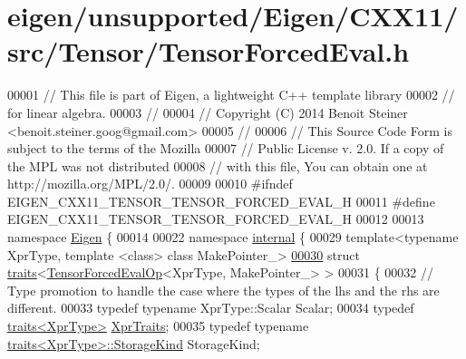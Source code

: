 \hypertarget{eigen_2unsupported_2_eigen_2_c_x_x11_2src_2_tensor_2_tensor_forced_eval_8h_source}{}\section{eigen/unsupported/\+Eigen/\+C\+X\+X11/src/\+Tensor/\+Tensor\+Forced\+Eval.h}
\label{eigen_2unsupported_2_eigen_2_c_x_x11_2src_2_tensor_2_tensor_forced_eval_8h_source}

\begin{DoxyCode}
00001 \textcolor{comment}{// This file is part of Eigen, a lightweight C++ template library}
00002 \textcolor{comment}{// for linear algebra.}
00003 \textcolor{comment}{//}
00004 \textcolor{comment}{// Copyright (C) 2014 Benoit Steiner <benoit.steiner.goog@gmail.com>}
00005 \textcolor{comment}{//}
00006 \textcolor{comment}{// This Source Code Form is subject to the terms of the Mozilla}
00007 \textcolor{comment}{// Public License v. 2.0. If a copy of the MPL was not distributed}
00008 \textcolor{comment}{// with this file, You can obtain one at http://mozilla.org/MPL/2.0/.}
00009 
00010 \textcolor{preprocessor}{#ifndef EIGEN\_CXX11\_TENSOR\_TENSOR\_FORCED\_EVAL\_H}
00011 \textcolor{preprocessor}{#define EIGEN\_CXX11\_TENSOR\_TENSOR\_FORCED\_EVAL\_H}
00012 
00013 \textcolor{keyword}{namespace }\hyperlink{namespace_eigen}{Eigen} \{
00014 
00022 \textcolor{keyword}{namespace }\hyperlink{namespaceinternal}{internal} \{
00029 \textcolor{keyword}{template}<\textcolor{keyword}{typename} XprType, \textcolor{keyword}{template} <\textcolor{keyword}{class}> \textcolor{keyword}{class }MakePointer\_>
\hyperlink{struct_eigen_1_1internal_1_1traits_3_01_tensor_forced_eval_op_3_01_xpr_type_00_01_make_pointer___01_4_01_4}{00030} \textcolor{keyword}{struct }\hyperlink{struct_eigen_1_1internal_1_1traits}{traits}<\hyperlink{class_eigen_1_1_tensor_forced_eval_op}{TensorForcedEvalOp}<XprType, MakePointer\_> >
00031 \{
00032   \textcolor{comment}{// Type promotion to handle the case where the types of the lhs and the rhs are different.}
00033   \textcolor{keyword}{typedef} \textcolor{keyword}{typename} XprType::Scalar Scalar;
00034   \textcolor{keyword}{typedef} \hyperlink{struct_eigen_1_1internal_1_1traits}{traits<XprType>} \hyperlink{struct_eigen_1_1internal_1_1traits}{XprTraits};
00035   \textcolor{keyword}{typedef} \textcolor{keyword}{typename} \hyperlink{struct_eigen_1_1internal_1_1traits}{traits<XprType>::StorageKind} StorageKind;

\end{DoxyCode}
